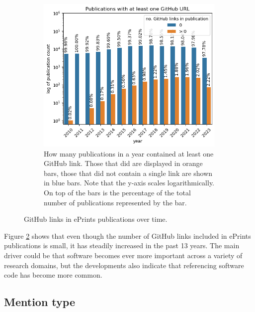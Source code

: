 \documentclass[10pt,a4paper]{scrartcl}
\begin{document}
\begin{figure}[h]
\begin{subfigure}[t]{0.3\textwidth}
    \end{subfigure}
    \hfill
    \begin{subfigure}[t]{0.3\textwidth}
        \centering
        \includegraphics[width=\textwidth]{../analysis/overall/min_one_github_in_eprints.png}
        \caption{How many publications in a year contained at least one GitHub link.
        Those that did are displayed in orange bars, those that did not contain a single link are shown in blue bars.
        Note that the y-axis scales logarithmically.
        On top of the bars is the percentage of the total number of publications represented by the bar.}
        \label{fig:gh_ep_min_one}
    \end{subfigure}
       \caption{GitHub links in ePrints publications over time.}
       \label{fig:gh_ep}
\end{figure}

Figure \ref{fig:gh_ep} shows that even though the number of GitHub links included in ePrints publications is small,
it has steadily increased in the past 13 years.
The main driver could be that software becomes ever more important across a variety of research domains,
but the developments also indicate that referencing software code has become more common.

\subsection*{Mention type}
\end{document}
